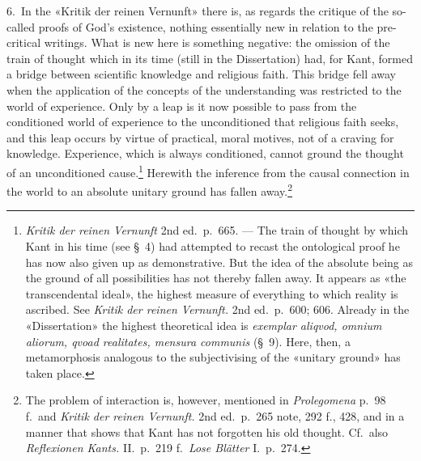 \documentclass[12pt,a4paper]{article}
\newcommand{\opage}[1]{\marginnote{\footnotesize\textit{[#1]}}}
\begin{document}
6.\ In the «Kritik der reinen Vernunft» there is, as regards the critique
of the so-called proofs of God's existence, nothing essentially new in
relation to the pre-critical writings. What is new here is something
negative: the omission of the train of thought which in its time (still in
the Dissertation) had, for Kant, formed a bridge between scientific
knowledge and religious faith. This bridge fell away when the application
of the concepts of the understanding was restricted to the world of
experience. Only by a leap is it now possible to pass from the conditioned
world of experience to the unconditioned that religious faith seeks, and
this leap occurs by virtue of practical, moral motives, not of a craving
for knowledge. Experience, which is always conditioned, cannot ground the
thought of an unconditioned cause.\footnote{\textit{Kritik der reinen
Vernunft} 2nd ed.\ p.\ 665. --- The train of thought by which Kant in his
time (see §\ 4) had attempted to recast the ontological proof he has now
also given up as demonstrative. But the idea of the absolute being as the
ground of all possibilities has not thereby fallen away. It appears as
«the transcendental ideal», the highest measure of everything to which
reality is ascribed. See \textit{Kritik der reinen Vernunft.} 2nd ed.\
p.\ 600; 606. Already in the «Dissertation» the highest theoretical idea
is \textit{exemplar aliqvod, omnium aliorum, qvoad realitates, mensura
communis} (§\ 9). Here, then, a metamorphosis analogous to the
subjectivising of the «unitary ground» has taken place.} \opage{16}Herewith the
inference from the causal connection in the world to an absolute unitary
ground has fallen away.\footnote{The problem of interaction is, however,
mentioned in \textit{Prolegomena} p.\ 98 f.\ and \textit{Kritik der reinen
Vernunft.} 2nd ed.\ p.\ 265 note, 292 f., 428, and in a manner that shows
that Kant has not forgotten his old thought. Cf.\ also \textit{Reflexionen
Kants.} II.\ p.\ 219 f.\ \textit{Lose Blätter} I.\ p.\ 274.}
\end{document}
